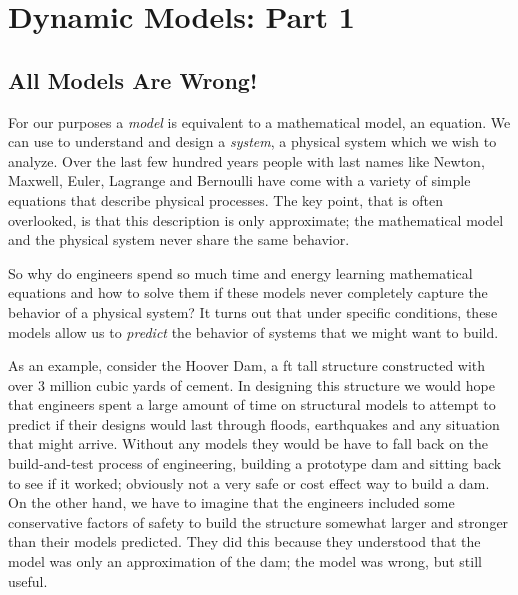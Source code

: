 \chapter{Dynamic Models: Part 1}\label{c:model1}
\renewcommand{\epigraphsize}{\small\itshape}
\renewcommand{\epigraphwidth}{4.25in}
\renewcommand{\epigraphrule}{0pt}
\begin{epigraphs}
\end{epigraphs}

\section{All Models Are Wrong!}
For our purposes a \emph{model} is equivalent to a \gls{mathematical model}, an equation.  We can use to understand and design a \emph{system}, a physical system which we wish to analyze.  Over the last few hundred years people with last names like Newton, Maxwell, Euler, Lagrange  and Bernoulli have come with a variety of simple equations that describe physical processes.  The key point, that is often overlooked, is that this description is only approximate; the mathematical model and the physical system never share the same behavior.

So why do engineers spend so much time and energy learning mathematical equations and how to solve them if these models never completely capture the behavior of a physical system?  It turns out that under specific conditions, these models allow us to \emph{predict} the behavior of systems that we might want to build.  

As an example, consider the Hoover Dam, a \unit[726]{ft} tall structure constructed with over 3 million cubic yards of cement.  In designing this structure we would hope that engineers spent a large amount of time on structural models to attempt to predict if their designs would last through floods, earthquakes and any situation that might arrive.  Without any models they would be have to fall back on the build-and-test process of engineering, building a prototype dam and sitting back to see if it worked; obviously not a very safe or cost effect way to build a dam.  On the other hand, we have to imagine that the engineers included some conservative factors of safety to build the structure somewhat larger and stronger than their models predicted.  They did this because they understood that the model was only an approximation of the dam; the model was wrong, but still useful.  

